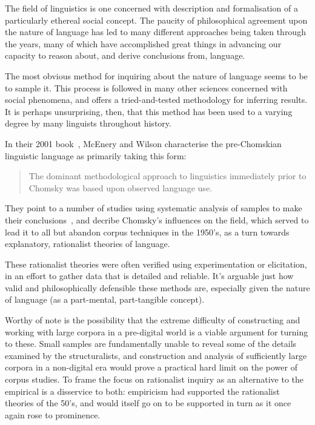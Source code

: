 

The field of linguistics is one concerned with description and formalisation of a particularly ethereal social concept.  The paucity of philosophical agreement upon the nature of language has led to many different approaches being taken through the years, many of which have accomplished great things in advancing our capacity to reason about, and derive conclusions from, language.


The most obvious method for inquiring about the nature of language seems to be to sample it.  This process is followed in many other sciences concerned with social phenomena, and offers a tried-and-tested methodology for inferring results.  It is perhaps unsurprising, then, that this method has been used to a varying degree by many linguists throughout history.

In their 2001 book~\cite{macenery2001corpus}, McEnery and Wilson characterise the pre-Chomskian linguistic language as primarily taking this form:

\begin{quote}
The dominant methodological approach to linguistics immediately prior to Chomsky was based upon observed language use.
\end{quote}

They point to a number of studies using systematic analysis of samples to make their conclusions~\cite{kaeding1897haufigkeitsworterbuch,preyer1889mind,stern1924psychology,eaton1940semantic,west1953general}, and decribe Chomsky's influences on the field, which served to lead it to all but abandon corpus techniques in the 1950's, as a turn towards explanatory, rationalist theories of language.

These rationalist theories were often verified using experimentation or elicitation, in an effort to gather data that is detailed and reliable.  It's arguable just how valid and philosophically defensible these methods are, especially given the nature of language (as a part-mental, part-tangible concept).


Worthy of note is the possibility that the extreme difficulty of constructing and working with large corpora in a pre-digital world is a viable argument for turning to these.  Small samples are fundamentally unable to reveal some of the details examined by the structuralists, and construction and analysis of sufficiently large corpora in a non-digital era would prove a practical hard limit on the power of corpus studies.  To frame the focus on rationalist inquiry as an alternative to the empirical is a disservice to both: empiricism had supported the rationalist theories of the 50's, and would itself go on to be supported in turn as it once again rose to prominence.

